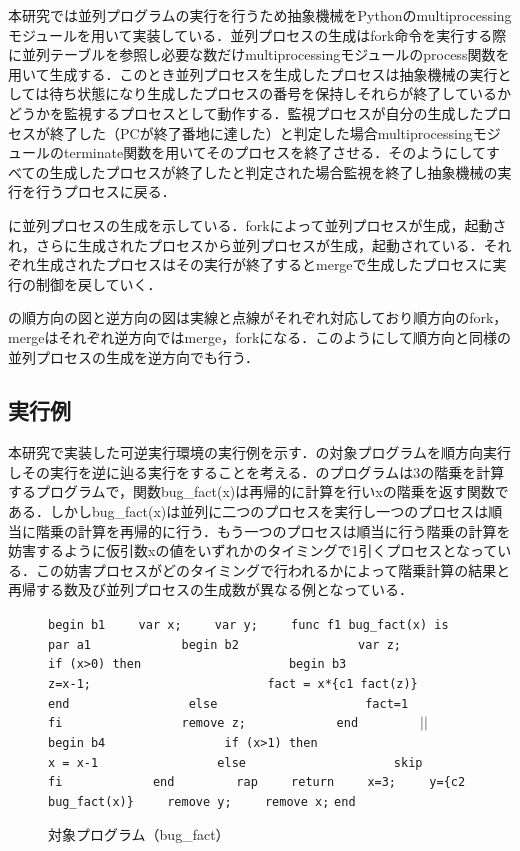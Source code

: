 \documentclass[submit,PRO]{ipsj}
\def\|{\verb|}
\begin{document}
本研究では並列プログラムの実行を行うため抽象機械をPythonのmultiprocessingモジュールを用いて実装している．並列プロセスの生成はfork命令を実行する際に並列テーブルを参照し必要な数だけmultiprocessingモジュールのprocess関数を用いて生成する．このとき並列プロセスを生成したプロセスは抽象機械の実行としては待ち状態になり生成したプロセスの番号を保持しそれらが終了しているかどうかを監視するプロセスとして動作する．監視プロセスが自分の生成したプロセスが終了した（PCが終了番地に達した）と判定した場合multiprocessingモジュールのterminate関数を用いてそのプロセスを終了させる．そのようにしてすべての生成したプロセスが終了したと判定された場合監視を終了し抽象機械の実行を行うプロセスに戻る．

に並列プロセスの生成を示している．forkによって並列プロセスが生成，起動され，さらに生成されたプロセスから並列プロセスが生成，起動されている．それぞれ生成されたプロセスはその実行が終了するとmergeで生成したプロセスに実行の制御を戻していく．

の順方向の図と逆方向の図は実線と点線がそれぞれ対応しており順方向のfork，mergeはそれぞれ逆方向ではmerge，forkになる．このようにして順方向と同様の並列プロセスの生成を逆方向でも行う．

\subsection{実行例}
本研究で実装した可逆実行環境の実行例を示す．の対象プログラムを順方向実行しその実行を逆に辿る実行をすることを考える．のプログラムは3の階乗を計算するプログラムで，関数bug\_fact(x)は再帰的に計算を行いxの階乗を返す関数である．しかしbug\_fact(x)は並列に二つのプロセスを実行し一つのプロセスは順当に階乗の計算を再帰的に行う．もう一つのプロセスは順当に行う階乗の計算を妨害するように仮引数xの値をいずれかのタイミングで1引くプロセスとなっている．この妨害プロセスがどのタイミングで行われるかによって階乗計算の結果と再帰する数及び並列プロセスの生成数が異なる例となっている．



\begin{figure}[tb]
\vbox{
\hbox{\|begin b1|}
\hbox{\|    var x;|}
\hbox{\|    var y;|}
\hbox{\|    func f1 bug_fact(x) is|}
\hbox{\|        par a1|}
\hbox{\|            begin b2|}
\hbox{\|                var z;|}
\hbox{\|                if (x>0) then|}
\hbox{\|                    begin b3|}
\hbox{\|                        z=x-1;|}
\hbox{\|                        fact = x*{c1 fact(z)}|}
\hbox{\|                    end|}
\hbox{\|                else|}
\hbox{\|                    fact=1|}
\hbox{\|                fi|}
\hbox{\|                remove z;|}
\hbox{\|            end|}
\hbox{\|        |$||$\|  begin b4|}
\hbox{\|                if (x>1) then|}
\hbox{\|                    x = x-1|}
\hbox{\|                else|}
\hbox{\|                    skip|}
\hbox{\|                fi|}
\hbox{\|            end|}
\hbox{\|        rap|}
\hbox{\|    return|}
\hbox{\|    x=3;|}
\hbox{\|    y={c2 bug_fact(x)}|}
\hbox{\|    remove y;|}
\hbox{\|    remove x;|}
\hbox{\|end|}
}
\centerline{}
\caption{対象プログラム（bug\_fact）}
\label{fig:target}
\end{figure}
\end{document}
